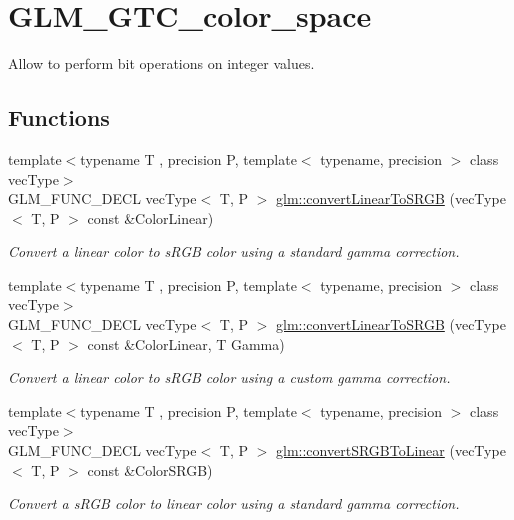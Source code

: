 \hypertarget{group__gtc__color__space}{}\section{G\+L\+M\+\_\+\+G\+T\+C\+\_\+color\+\_\+space}
\label{group__gtc__color__space}


Allow to perform bit operations on integer values.  


\subsection*{Functions}
\begin{DoxyCompactItemize}
\item 
{\footnotesize template$<$typename T , precision P, template$<$ typename, precision $>$ class vec\+Type$>$ }\\G\+L\+M\+\_\+\+F\+U\+N\+C\+\_\+\+D\+E\+C\+L vec\+Type$<$ T, P $>$ \hyperlink{group__gtc__color__space_gad813dcd99644cafc775e83d6504ccb93}{glm\+::convert\+Linear\+To\+S\+R\+G\+B} (vec\+Type$<$ T, P $>$ const \&Color\+Linear)
\begin{DoxyCompactList}\small\item\em Convert a linear color to s\+R\+G\+B color using a standard gamma correction. \end{DoxyCompactList}\item 
{\footnotesize template$<$typename T , precision P, template$<$ typename, precision $>$ class vec\+Type$>$ }\\G\+L\+M\+\_\+\+F\+U\+N\+C\+\_\+\+D\+E\+C\+L vec\+Type$<$ T, P $>$ \hyperlink{group__gtc__color__space_ga63f8b003da7acf44370eb47bfb8b3d42}{glm\+::convert\+Linear\+To\+S\+R\+G\+B} (vec\+Type$<$ T, P $>$ const \&Color\+Linear, T Gamma)
\begin{DoxyCompactList}\small\item\em Convert a linear color to s\+R\+G\+B color using a custom gamma correction. \end{DoxyCompactList}\item 
{\footnotesize template$<$typename T , precision P, template$<$ typename, precision $>$ class vec\+Type$>$ }\\G\+L\+M\+\_\+\+F\+U\+N\+C\+\_\+\+D\+E\+C\+L vec\+Type$<$ T, P $>$ \hyperlink{group__gtc__color__space_ga28e98e64347cf385cadc1ceb4def55c9}{glm\+::convert\+S\+R\+G\+B\+To\+Linear} (vec\+Type$<$ T, P $>$ const \&Color\+S\+R\+G\+B)
\begin{DoxyCompactList}\small\item\em Convert a s\+R\+G\+B color to linear color using a standard gamma correction. \end{DoxyCompactList}\item 

\end{DoxyCompactItemize}
